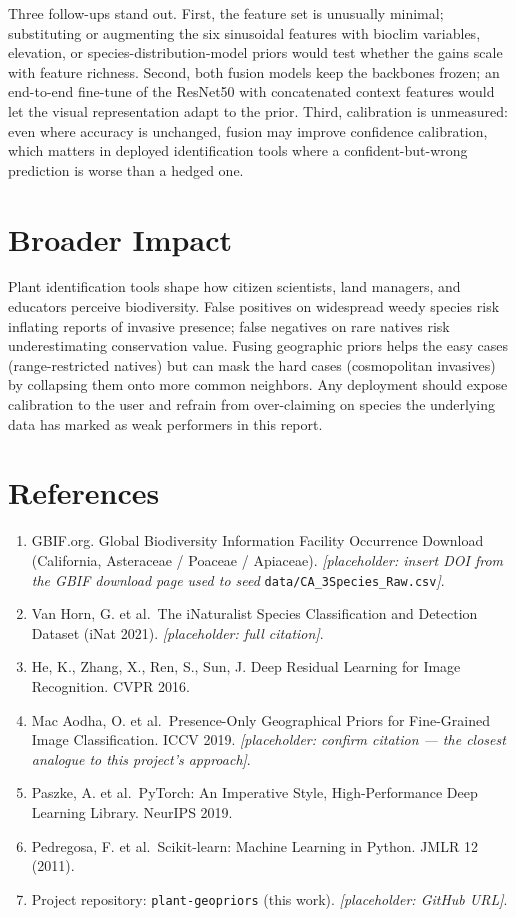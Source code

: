 \documentclass[11pt]{article}
\begin{document}
Three follow-ups stand out. First, the feature set is unusually minimal; substituting or augmenting the six sinusoidal features with bioclim variables, elevation, or species-distribution-model priors would test whether the gains scale with feature richness. Second, both fusion models keep the backbones frozen; an end-to-end fine-tune of the ResNet50 with concatenated context features would let the visual representation adapt to the prior. Third, calibration is unmeasured: even where accuracy is unchanged, fusion may improve confidence calibration, which matters in deployed identification tools where a confident-but-wrong prediction is worse than a hedged one.

\section{Broader Impact}

Plant identification tools shape how citizen scientists, land managers, and educators perceive biodiversity. False positives on widespread weedy species risk inflating reports of invasive presence; false negatives on rare natives risk underestimating conservation value. Fusing geographic priors helps the easy cases (range-restricted natives) but can mask the hard cases (cosmopolitan invasives) by collapsing them onto more common neighbors. Any deployment should expose calibration to the user and refrain from over-claiming on species the underlying data has marked as weak performers in this report.

\section*{References}

\begin{enumerate}
    \item GBIF.org. Global Biodiversity Information Facility Occurrence Download (California, Asteraceae / Poaceae / Apiaceae). \textit{[placeholder: insert DOI from the GBIF download page used to seed} \texttt{data/CA\_3Species\_Raw.csv}\textit{]}.
    \item Van Horn, G. et al.\ The iNaturalist Species Classification and Detection Dataset (iNat 2021). \textit{[placeholder: full citation]}.
    \item He, K., Zhang, X., Ren, S., Sun, J. Deep Residual Learning for Image Recognition. CVPR 2016.
    \item Mac Aodha, O. et al.\ Presence-Only Geographical Priors for Fine-Grained Image Classification. ICCV 2019. \textit{[placeholder: confirm citation --- the closest analogue to this project's approach]}.
    \item Paszke, A. et al.\ PyTorch: An Imperative Style, High-Performance Deep Learning Library. NeurIPS 2019.
    \item Pedregosa, F. et al.\ Scikit-learn: Machine Learning in Python. JMLR 12 (2011).
    \item Project repository: \texttt{plant-geopriors} (this work). \textit{[placeholder: GitHub URL]}.
\end{enumerate}
\end{document}
